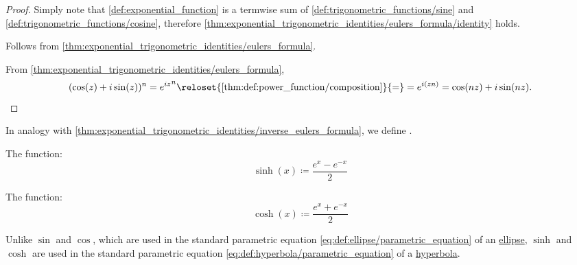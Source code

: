 \begin{proof}
   Simply note that \cref{def:exponential_function} is a termwise sum of \cref{def:trigonometric_functions/sine} and \cref{def:trigonometric_functions/cosine}, therefore \cref{thm:exponential_trigonometric_identities/eulers_formula/identity} holds.

   Follows from \cref{thm:exponential_trigonometric_identities/eulers_formula}.

   From \cref{thm:exponential_trigonometric_identities/eulers_formula},
  \begin{equation*}
    (\cos(z) + i \sin(z))^n
    =
    {e^{iz}}^n
    \reloset {\ref{thm:def:power_function/composition}} {=}
    =
    e^{i(zn)}
    =
    \cos(nz) + i \sin(nz).
  \end{equation*}
\end{proof}


\begin{definition}\label{def:hyperbolic_trigonometric_functions}
  In analogy with \cref{thm:exponential_trigonometric_identities/inverse_eulers_formula}, we define .

  \begin{thmenum}
     The  function:
    \begin{equation*}
      \sinh(x) \coloneqq \frac {e^x - e^{-x}} 2
    \end{equation*}

     The  function:
    \begin{equation*}
      \cosh(x) \coloneqq \frac {e^x + e^{-x}} 2
    \end{equation*}
  \end{thmenum}
\end{definition}
\begin{comments}
  \item Unlike \( \sin \) and \( \cos \), which are used in the standard parametric equation \eqref{eq:def:ellipse/parametric_equation} of an \hyperref[def:ellipse]{ellipse}, \( \sinh \) and \( \cosh \) are used in the standard parametric equation \eqref{eq:def:hyperbola/parametric_equation} of a \hyperref[def:hyperbola]{hyperbola}.
\end{comments}

